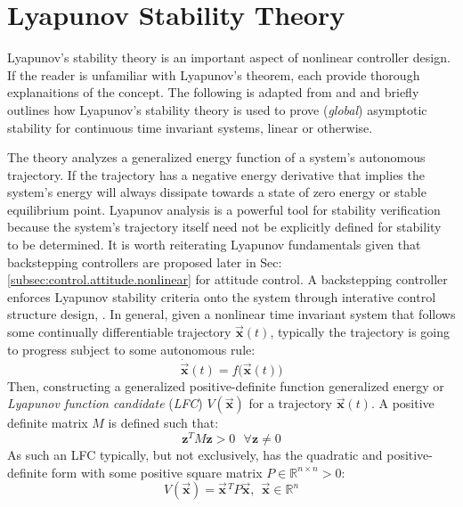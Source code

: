 \section{Lyapunov Stability Theory}
\label{sec:control.lyapunov}
Lyapunov's stability theory is an important aspect of nonlinear controller design. If the reader is unfamiliar with Lyapunov's theorem,  \cite{noteonlyapunov,nonlinearsystems,bojelayupanov} each provide thorough explanaitions of the concept. The following is adapted from \cite{lyapunovconference} and \cite{lyapunovpaper} and briefly outlines how Lyapunov's stability theory is used to prove (\emph{global}) asymptotic stability for continuous time invariant systems, linear or otherwise. 
\par
The theory analyzes a generalized energy function of a system's autonomous trajectory. If the trajectory has a negative energy derivative that implies the system's energy will always dissipate towards a state of zero energy or stable equilibrium point. Lyapunov analysis is a powerful tool for stability verification because the system's trajectory itself need not be explicitly defined for stability to be determined. It is worth reiterating Lyapunov fundamentals given that backstepping controllers are proposed later in Sec:\ref{subsec:control.attitude.nonlinear} for attitude control.
\newpage
A backstepping controller enforces Lyapunov stability criteria onto the system through interative control structure design, \cite{backstepping,adaptivebackstep,intelligentbackstep}. In general, given a nonlinear time invariant system that follows some continually differentiable trajectory $\vec{\mathbf{x}}(t)$, typically the trajectory is going to progress subject to some autonomous rule:
\begin{equation}\label{eq:4.17}
\dot{\vec{\mathbf{x}}}(t)=f\big(\vec{\mathbf{x}}(t)\big)
\end{equation}
Then, constructing a generalized positive-definite function generalized energy or \emph{Lyapunov function candidate} (\emph{LFC}) $V(\vec{\mathbf{x}})$ for a trajectory $\vec{\mathbf{x}}(t)$. A positive definite matrix $M$ is defined such that:
\begin{equation}
\mathbf{z}^TM\mathbf{z} > 0~~~\forall \mathbf{z}\not = 0
\end{equation}
As such an LFC typically, but not exclusively, has the quadratic and positive-definite form with some positive square matrix $P\in\mathbb{R}^{n\times n}>0$:
\begin{equation}
V(\vec{\mathbf{x}})=\vec{\mathbf{x}}\hspace{1pt}^TP\vec{\mathbf{x}},~~\vec{\mathbf{x}}\in\mathbb{R}^{n}
\end{equation}
